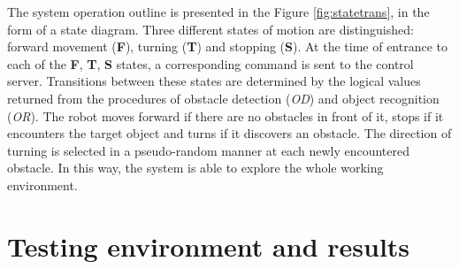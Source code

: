 The system operation outline is presented in the Figure \ref{fig:statetrans}, in the form of a state diagram. Three different states of motion are distinguished: forward movement (\textbf{F}), turning (\textbf{T}) and stopping (\textbf{S}). 
At the time of entrance to each of the \textbf{F}, \textbf{T}, \textbf{S} states, a corresponding command is sent to the control server. Transitions between these states are determined by the logical values returned from the procedures of obstacle detection (\textit{OD}) and object recognition (\textit{OR}). The robot moves forward if there are no obstacles in front of it, stops if it encounters the target object and turns if it discovers an obstacle. The direction of turning is selected in a pseudo-random manner at each newly encountered obstacle. In this way, the system is able to explore the whole working environment. 


\section{Testing environment and results}
\label{sec:testing}

